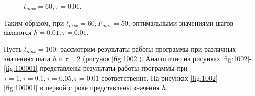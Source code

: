 \documentclass[a4paper,14pt]{article}
\begin{document}
\newpage
\begin{figure}[!h]
	\caption{$t_{max} = 60, \tau = 0.01$.}
	\label{fig:60001}
\end{figure}

Таким образом, при $t_{max} = 60, F_{max} = 50$, оптимальными
значениями шагов являются $h = 0.01, \tau = 0.01$.

Пусть $t_{max} = 100$. рассмотрим результаты работы программы
при различных значениях шага  $h$ и $\tau = 2$ (рисунок \ref{fig:1002}). Аналогично на рисунках
\ref{fig:1002}-\ref{fig:100001} представлены результаты работы программы при $\tau = 1, \tau = 0.1, \tau = 0.05, \tau = 0.01$
соответственно.  На рисунках \ref{fig:1002}-\ref{fig:100001} в первой строке представлены значения $h$.
\end{document}
